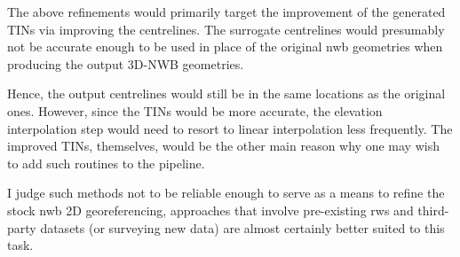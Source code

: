 The above refinements would primarily target the improvement of the generated TINs via improving the centrelines. The surrogate centrelines would presumably not be accurate enough to be used in place of the original \ac{nwb} geometries when producing the output 3D-NWB geometries.

Hence, the output centrelines would still be in the same locations as the original ones. However, since the TINs would be more accurate, the elevation interpolation step would need to resort to linear interpolation less frequently. The improved TINs, themselves, would be the other main reason why one may wish to add such routines to the pipeline.

I judge such methods not to be reliable enough to serve as a means to refine the stock \ac{nwb} 2D georeferencing, approaches that involve pre-existing \ac{rws} and third-party datasets (or surveying new data) are almost certainly better suited to this task.